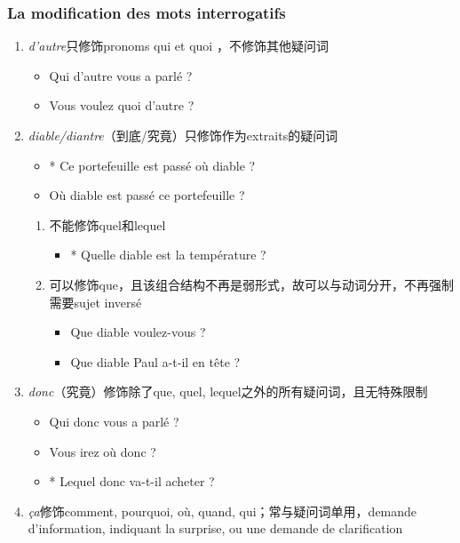 \documentclass[UTF8]{report}
\begin{document}
\subsubsection{La modification des mots interrogatifs}
\begin{enumerate}
    \item \textit{d’autre}只修饰pronoms qui et quoi ，不修饰其他疑问词
    \begin{itemize}
        \item Qui d’autre vous a parlé ?
        \item Vous voulez quoi d’autre ?
    \end{itemize}
    \item \textit{diable/diantre}（到底/究竟）只修饰作为extraits的疑问词
    \begin{itemize}
        \item * Ce portefeuille est passé où diable ?
        \item Où diable est passé ce portefeuille ?
    \end{itemize}
    \begin{enumerate}
        \item 不能修饰quel和lequel
        \begin{itemize}
            \item * Quelle diable est la température ?
        \end{itemize}
        \item 可以修饰que，且该组合结构不再是弱形式，故可以与动词分开，不再强制需要sujet inversé
        \begin{itemize}
            \item Que diable voulez-vous ?
            \item Que diable Paul a-t-il en tête ?
        \end{itemize}
    \end{enumerate}
    \item \textit{donc}（究竟）修饰除了que, quel, lequel之外的所有疑问词，且无特殊限制
    \begin{itemize}
        \item Qui donc vous a parlé ?
        \item Vous irez où donc ?
        \item * Lequel donc va-t-il acheter ?
    \end{itemize}
    \item \textit{ça}修饰comment, pourquoi, où, quand, qui；常与疑问词单用，demande d’information, indiquant la surprise, ou une demande de clarification

\end{enumerate}
\end{document}
